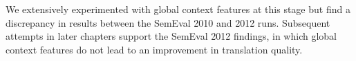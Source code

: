 We extensively experimented with global context features at this stage but find
a discrepancy in results between the SemEval 2010 and 2012 runs. Subsequent
attempts in later chapters support the SemEval 2012 findings, in which global
context features do not lead to an improvement in translation quality.













